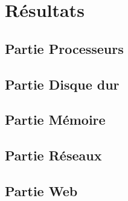 \chapter{Résultats}

\section{Partie Processeurs}

\section{Partie Disque dur }

\section{Partie Mémoire}

\section{Partie Réseaux }

\section{Partie Web}
